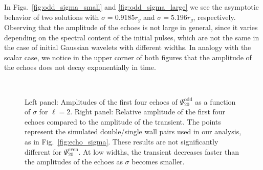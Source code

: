 \documentclass[article,aps,nofootinbib,twocolumn,superscriptaddress]{revtex4-1}
\begin{document}
In Figs.~\ref{fig:odd_sigma_small} and \ref{fig:odd_sigma_large} we see the asymptotic behavior of two solutions with $\sigma=0.9185r_g$ and $\sigma=5.196r_g$, respectively. Observing that the amplitude of the echoes is not large in general, since it varies depending on the spectral content of the initial pulses, which are not the same in the case of initial Gaussian wavelets with different widths. In analogy with the scalar case, we notice in the upper corner of both figures that the amplitude of the echoes does not decay exponentially in time.
\par
\begin{figure}
\centering
{} \,
\caption{\label{fig:echo_sigma_odd} Left panel: Amplitudes of the first four echoes of $\Psi^{\mathrm{odd}}_{20}$ as a function of $\sigma$ for $\ell=2$. Right panel: Relative amplitude of the first four echoes compared to the amplitude of the transient. The points represent the simulated double/single wall pairs used in our analysis, as in Fig.~\ref{fig:echo_sigma}. These results are not significantly different for $\Psi^{\mathrm{even}}_{20}$. At low widths, the transient decreases faster than the amplitudes of the echoes as $\sigma$ becomes smaller.} 
\end{figure}
\end{document}
